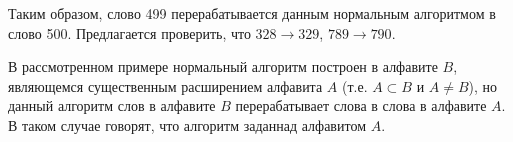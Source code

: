 \documentclass{article}
\begin{document}
Таким образом, слово 499 перерабатывается данным нормальным алгоритмом в слово 500. Предлагается проверить, что $328 \rightarrow 329$, $789 \rightarrow 790$.

В рассмотренном примере нормальный алгоритм построен в алфавите $B$, являющемся существенным расширением алфавита $A$ (т.е. $A \subset B$ и $A \neq B$), но данный алгоритм слов в алфавите $B$ перерабатывает слова в слова в алфавите $A$. В таком случае говорят, что алгоритм заданнад алфавитом $A$.
\end{document}
